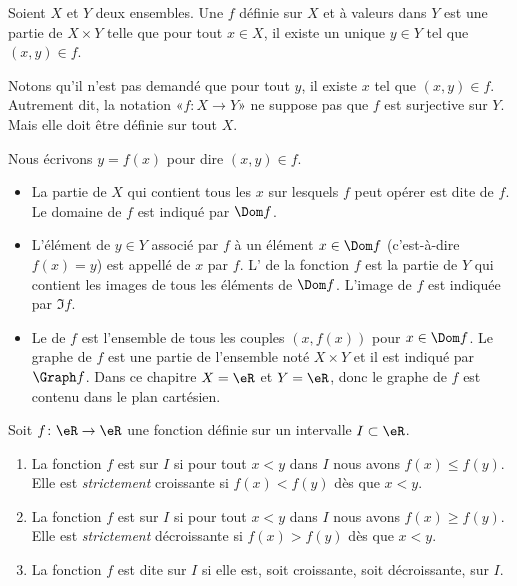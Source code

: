 \begin{definition}
	Soient \( X\) et \( Y\) deux ensembles. Une  \( f\) définie sur \( X\) et à valeurs dans \( Y\) est une partie de \( X\times Y\) telle que pour tout \( x\in X\), il existe un unique \( y\in Y\) tel que \( (x,y)\in f\).
\end{definition}

\begin{normaltext}
	Notons qu'il n'est pas demandé que pour tout \( y\), il existe \( x\) tel que \( (x,y)\in f\). Autrement dit, la notation «\( f\colon X\to Y\)» ne suppose pas que \( f\) est surjective sur \( Y\). Mais elle doit être définie sur tout \( X\).

	Nous écrivons \( y=f(x)\) pour dire \( (x,y)\in f\).
	\begin{itemize}
		\item La partie de \( X\) qui contient tous les \( x\) sur lesquels \( f\) peut opérer est dite  de \( f\). Le domaine de \( f\) est indiqué par \( \Dom f\).
		\item L'élément de \( y\in Y\) associé par \( f\) à un élément \( x\in \Dom f\) (c'est-à-dire \( f(x) = y\))  est appellé  de \( x\) par \( f\). L' de la fonction \( f\) est la partie de \( Y\) qui contient les images de tous les éléments de \( \Dom f\). L'image de \( f\) est indiquée par \( \Im f\).
		\item Le  de \( f\) est l'ensemble de tous les couples \( (x, f(x))\) pour \( x\in \Dom f\). Le graphe de \( f\) est une partie de l'ensemble noté \( X\times Y\) et il est indiqué par \( \Graph f\). Dans ce chapitre \( X = \eR\) et \( Y = \eR\), donc le graphe de \( f\) est contenu dans le plan cartésien.
	\end{itemize}
    
\end{normaltext}

\begin{definition}
	Soit \( f\colon \eR\to \eR\) une fonction définie sur un intervalle \( I\subset \eR\).
	\begin{enumerate}
		\item
		      La fonction \( f\) est  sur \( I\) si pour tout \( x<y\) dans \( I\) nous avons \( f(x)\leq f(y)\). Elle est \emph{strictement} croissante si \( f(x)<f(y)\) dès que \( x<y\).
		\item
		      La fonction \( f\) est  sur \( I\) si pour tout \( x<y\) dans \( I\) nous avons \( f(x)\geq f(y)\). Elle est \emph{strictement} décroissante si \( f(x)>f(y)\) dès que \( x<y\).
		\item
		      La fonction \( f\) est dite  sur \( I\) si elle est, soit croissante, soit décroissante, sur \( I\).
	\end{enumerate}
\end{definition}

